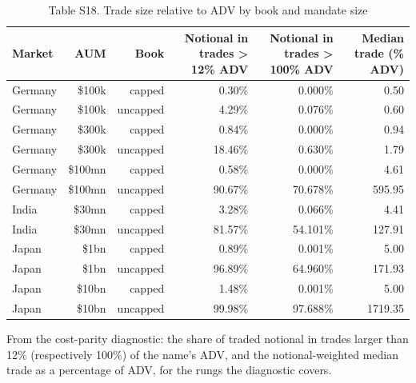 \begin{table}[t]
\centering
\small
\caption{Table S18. Trade size relative to ADV by book and mandate size}
\label{tab:s18}
\begin{tabular}{lrrrrr}
\toprule
Market & AUM & Book & Notional in trades > 12\% ADV & Notional in trades > 100\% ADV & Median trade (\% ADV) \\
\midrule
Germany & \$100k & capped & 0.30\% & 0.000\% & 0.50 \\
Germany & \$100k & uncapped & 4.29\% & 0.076\% & 0.60 \\
Germany & \$300k & capped & 0.84\% & 0.000\% & 0.94 \\
Germany & \$300k & uncapped & 18.46\% & 0.630\% & 1.79 \\
Germany & \$100mn & capped & 0.58\% & 0.000\% & 4.61 \\
Germany & \$100mn & uncapped & 90.67\% & 70.678\% & 595.95 \\
India & \$30mn & capped & 3.28\% & 0.066\% & 4.41 \\
India & \$30mn & uncapped & 81.57\% & 54.101\% & 127.91 \\
Japan & \$1bn & capped & 0.89\% & 0.001\% & 5.00 \\
Japan & \$1bn & uncapped & 96.89\% & 64.960\% & 171.93 \\
Japan & \$10bn & capped & 1.48\% & 0.001\% & 5.00 \\
Japan & \$10bn & uncapped & 99.98\% & 97.688\% & 1719.35 \\
\bottomrule
\end{tabular}
\par\vspace{2pt}
\parbox{\textwidth}{\footnotesize From the cost-parity diagnostic: the share of traded notional in trades larger than 12\% (respectively 100\%) of the name's ADV, and the notional-weighted median trade as a percentage of ADV, for the rungs the diagnostic covers.}
\end{table}
